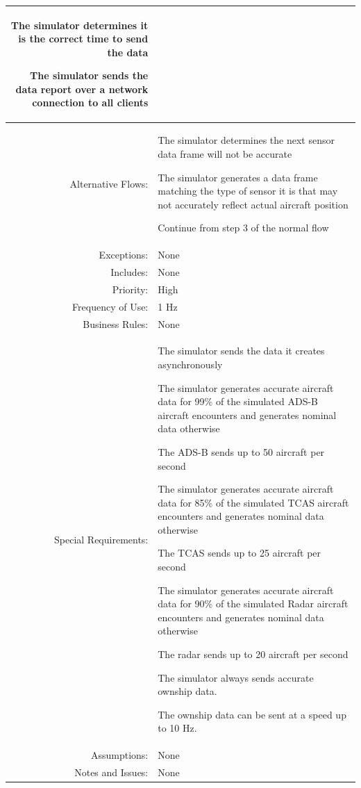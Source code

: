 \documentclass[12pt,oneside,letterpaper]{article}
\newenvironment{packed_enumerate}{ %
\vspace{-7mm}
\begin{enumerate}
  \setlength{\itemsep}{0pt}
  \setlength{\parskip}{0pt}
  \setlength{\parsep}{0pt}
}{\end{enumerate}
\vspace{-8mm}}
\begin{document}
\begin{longtable}{|r|p{3.8in}|}
\begin{packed_enumerate}
\item The simulator determines it is the correct time to send the data
\item The simulator sends the data report over a network connection to all clients
\end{packed_enumerate}\\
\hline
Alternative Flows:&
\begin{packed_enumerate}
\item The simulator determines the next sensor data frame will not be accurate
\item The simulator generates a data frame matching the type of sensor it is that may not accurately reflect actual aircraft position
\item Continue from step 3 of the normal flow
\end{packed_enumerate}\\
\hline
Exceptions:&None\\
\hline
Includes:&None\\
\hline
Priority:&High\\
\hline
Frequency of Use:&1 Hz\\
\hline
Business Rules:&None\\
\hline
Special Requirements:&
\begin{packed_enumerate}
\item The simulator sends the data it creates asynchronously
\item The simulator generates accurate aircraft data for 99\% of the simulated ADS-B aircraft encounters and generates nominal data otherwise
\item The ADS-B sends up to 50 aircraft per second
\item The simulator generates accurate aircraft data for 85\% of the simulated TCAS aircraft encounters and generates nominal data otherwise
\item The TCAS sends up to 25 aircraft per second
\item The simulator generates accurate aircraft data for 90\% of the simulated Radar aircraft encounters and generates nominal data otherwise
\item The radar sends up to 20 aircraft per second
\item The simulator always sends accurate ownship data.
\item The ownship data can be sent at a speed up to 10 Hz.
\end{packed_enumerate}\\
\hline
Assumptions:&None\\
\hline
Notes and Issues:&None\\
\hline
\end{longtable}
\end{document}
